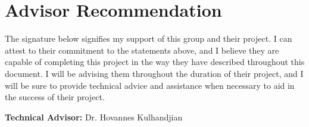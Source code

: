 \documentclass[10pt,onecolumn,draftcls]{IEEEtran} 					%
\begin{document}
	\section{Advisor Recommendation}
	The signature below signifies my support of this group and their project. I can attest to their commitment to the statements above, and I believe they are capable of completing this project in the way they have described throughout this document. I will be advising them throughout the duration of their project, and I will be sure to provide technical advice and assistance when necessary to aid in the success of their project.\\
	
	\begin{flushleft}
	\textbf{Technical Advisor:} Dr. Hovannes Kulhandjian
	\underline{\hspace{3in}} \\
	\vspace{12in}
\end{flushleft}
\end{document}
